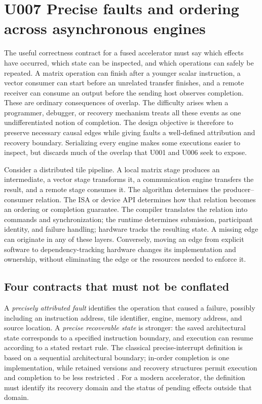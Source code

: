 \section{U007 Precise faults and ordering across asynchronous engines}
\label{sec:u007}

The useful correctness contract for a fused accelerator must say which effects have occurred, which state can be inspected, and which operations can safely be repeated. A matrix operation can finish after a younger scalar instruction, a vector consumer can start before an unrelated transfer finishes, and a remote receiver can consume an output before the sending host observes completion. These are ordinary consequences of overlap. The difficulty arises when a programmer, debugger, or recovery mechanism treats all these events as one undifferentiated notion of completion. The design objective is therefore to preserve necessary causal edges while giving faults a well-defined attribution and recovery boundary. Serializing every engine makes some executions easier to inspect, but discards much of the overlap that U001 and U006 seek to expose.

Consider a distributed tile pipeline. A local matrix stage produces an intermediate, a vector stage transforms it, a communication engine transfers the result, and a remote stage consumes it. The algorithm determines the producer--consumer relation. The ISA or device API determines how that relation becomes an ordering or completion guarantee. The compiler translates the relation into commands and synchronization; the runtime determines submission, participant identity, and failure handling; hardware tracks the resulting state. A missing edge can originate in any of these layers. Conversely, moving an edge from explicit software to dependency-tracking hardware changes its implementation and ownership, without eliminating the edge or the resources needed to enforce it.

\subsection{Four contracts that must not be conflated}

A \emph{precisely attributed fault} identifies the operation that caused a failure, possibly including an instruction address, tile identifier, engine, memory address, and source location. A \emph{precise recoverable state} is stronger: the saved architectural state corresponds to a specified instruction boundary, and execution can resume according to a stated restart rule. The classical precise-interrupt definition is based on a sequential architectural boundary; in-order completion is one implementation, while retained versions and recovery structures permit execution and completion to be less restricted \citep{u007_smith_pleszkun}. For a modern accelerator, the definition must identify its recovery domain and the status of pending effects outside that domain.

